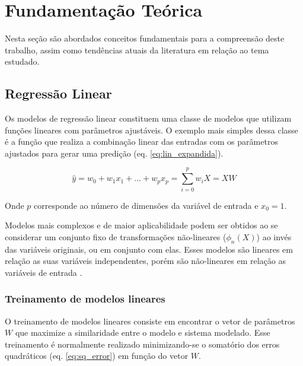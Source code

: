\chapter[Fundamentação Teórica]{Fundamentação Teórica}

Nesta seção são abordados conceitos fundamentais para a compreensão deste trabalho, assim como tendências atuais da literatura em relação ao tema estudado.

\section{Regressão Linear}

Os modelos de regressão linear constituem uma classe de modelos que utilizam funções lineares com parâmetros ajustáveis. O exemplo mais simples dessa classe é a função que realiza a combinação linear das entradas com os parâmetros ajustados para gerar uma predição (eq. \ref{eq:lin_expandida}).

\begin{equation}
    \hat{y} = w_0 + w_1x_1+ ... + w_px_p = \sum_{i = 0}^{p} w_iX = XW
    \label{eq:lin_expandida}
\end{equation}

Onde $p$ corresponde ao número de dimensões da variável de entrada e $x_0 = 1$.

Modelos mais complexos e de maior aplicabilidade podem ser obtidos ao se considerar um conjunto fixo de 
transformações não-lineares ($\phi_n(X)$) ao invés das variáveis originais, ou em conjunto com elas. 
Esses modelos são lineares em relação as suas variáveis independentes, porém são não-lineares em relação 
as variáveis de entrada \cite{bishop_2006}.

\subsection{Treinamento de modelos lineares}

O treinamento de modelos lineares consiste em encontrar o vetor de parâmetros $W$ que maximize a similaridade entre o modelo e sistema modelado. Esse treinamento é normalmente realizado minimizando-se o somatório dos erros quadráticos (eq. \ref{eq:sq_error}) em função do vetor $W$.


